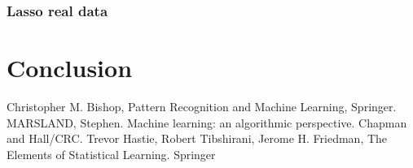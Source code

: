 \documentclass [11pt]{article}
\begin{document}
\subsubsection{Lasso real data}

\section*{Conclusion}

\begin{thebibliography}{111}
\raggedright
{} Christopher M. Bishop, Pattern Recognition and Machine Learning, Springer.
 MARSLAND, Stephen. Machine learning: an algorithmic perspective. Chapman and Hall/CRC.
 Trevor Hastie, Robert Tibshirani, Jerome H. Friedman, The Elements of Statistical Learning. Springer
\end{thebibliography}
\end{document}
